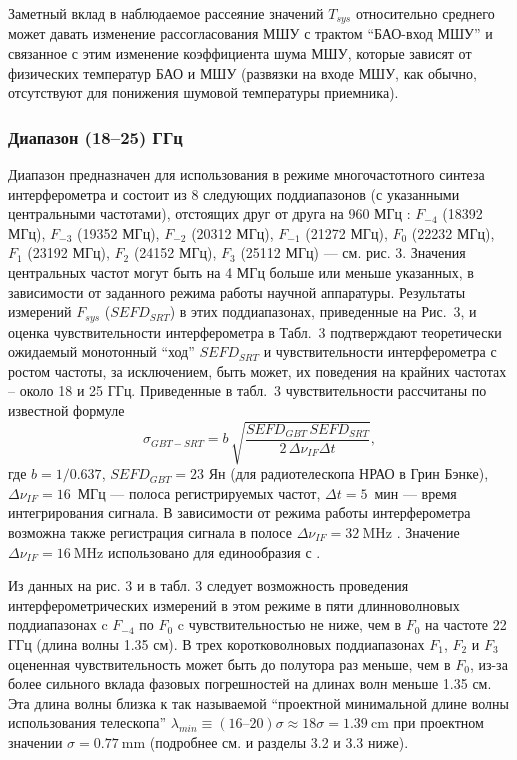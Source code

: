 Заметный вклад в наблюдаемое рассеяние значений $T_{sys}$ относительно среднего может давать
изменение рассогласования МШУ с трактом ``БАО-вход МШУ'' и связанное с этим изменение коэффициента
шума МШУ, которые зависят от физических температур БАО и МШУ (развязки на входе МШУ, как обычно,
отсутствуют для понижения шумовой температуры приемника).

\subsubsection{Диапазон (18--25) ГГц}

Диапазон предназначен для использования в режиме многочастотного синтеза интерферометра и состоит из
8 следующих поддиапазонов (с указанными центральными частотами), отстоящих друг от друга на 960 МГц
\cite{Kardashev_2013_rus}: $F_{-4}$ (18392 МГц), $F_{-3}$ (19352 МГц), $F_{-2}$ (20312 МГц),
$F_{-1}$ (21272 МГц), $F_0$ (22232 МГц), $F_1$ (23192 МГц),  $F_2$ (24152 МГц), $F_3$ (25112 МГц)
--- см. рис. 3. Значения центральных частот могут быть на 4 МГц больше или меньше указанных, в
зависимости от заданного режима работы научной аппаратуры. Результаты измерений $F_{sys}$
($SEFD_{SRT}$) в этих поддиапазонах, приведенные на Рис.~3, и оценка чувствительности интерферометра
в Табл.~3 подтверждают теоретически ожидаемый монотонный ``ход'' $SEFD_{SRT}$ и чувствительности
интерферометра с ростом частоты, за исключением, быть может, их поведения на крайних частотах --
около 18 и 25 ГГц. Приведенные в табл.~3 чувствительности  рассчитаны по известной формуле
\cite{Kardashev_2013_rus}
$$
\sigma_{GBT-SRT} = b\, \sqrt{\frac {SEFD_{GBT}\, SEFD_{SRT}}{2\, \Delta \nu_{IF} \Delta t}},
$$
\noindent
где $b = 1/0.637$, $SEFD_{GBT} = 23$ Ян (для радиотелескопа НРАО в Грин Бэнке),
$\Delta \nu_{IF} = 16$~МГц --- полоса регистрируемых частот, $\Delta t = 5$~мин ---
время интегрирования сигнала. В зависимости от режима
работы интерферометра возможна также регистрация сигнала в полосе $\Delta\nu_{IF} = \SI{32}{\MHz}$
\cite{Kardashev_2013_rus}. Значение $\Delta\nu_{IF} = \SI{16}{\MHz}$ использовано для единообразия с
\cite{RAUH}.

Из данных на рис. 3 и в табл. 3 следует возможность проведения интерферометрических измерений в этом
режиме в пяти длинноволновых поддиапазонах c $F_{-4}$ по $F_0$ c чувствительностью не ниже, чем в
$F_0$ на частоте 22 ГГц (длина волны 1.35 см). В трех коротковолновых поддиапазонах $F_1$, $F_2$ и
$F_3$ оцененная чувствительность может быть до полутора раз меньше, чем в $F_0$, из-за более
сильного вклада фазовых погрешностей на длинах волн меньше 1.35 см. Эта длина волны близка к так
называемой ``проектной минимальной длине волны использования телескопа'' $\lambda_{min} \equiv
(16\text{--}20)\sigma \approx 18\sigma= \SI{1.39}{\cm}$ при проектном значении $\sigma =
\SI{0.77}{\mm}$ (подробнее см. \cite{Esepkina_1973,Kuhn_1967,Cejtlin_1976} и разделы 3.2 и 3.3
ниже).

